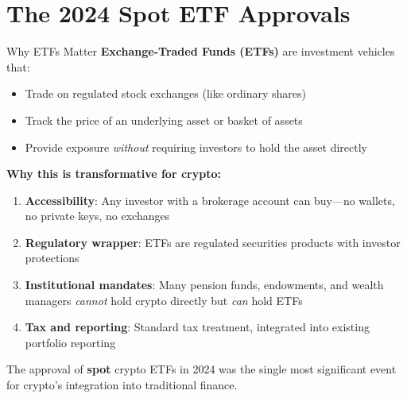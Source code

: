 \documentclass[10pt]{beamer}
\newcommand{\highlight}[1]{\textcolor{AccentOrange}{\textbf{#1}}}
\begin{document}
\section{The 2024 Spot ETF Approvals}

\begin{frame}{Why ETFs Matter}
  \textbf{Exchange-Traded Funds (ETFs)} are investment vehicles that:
  \begin{itemize}
    \item Trade on regulated stock exchanges (like ordinary shares)
    \item Track the price of an underlying asset or basket of assets
    \item Provide exposure \textit{without} requiring investors to hold the asset directly
  \end{itemize}
  
  \vspace{0.5em}
  \textbf{Why this is transformative for crypto:}
  \begin{enumerate}
    \item \textbf{Accessibility}: Any investor with a brokerage account can buy---no wallets, no private keys, no exchanges
    \item \textbf{Regulatory wrapper}: ETFs are regulated securities products with investor protections
    \item \textbf{Institutional mandates}: Many pension funds, endowments, and wealth managers \textit{cannot} hold crypto directly but \textit{can} hold ETFs
    \item \textbf{Tax and reporting}: Standard tax treatment, integrated into existing portfolio reporting
  \end{enumerate}
  
  \vspace{0.5em}
  The approval of \highlight{spot} crypto ETFs in 2024 was the single most significant event for crypto's integration into traditional finance.
\end{frame}
\end{document}
